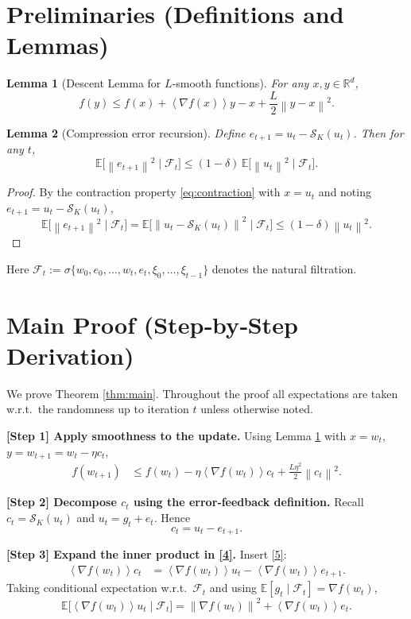 \documentclass{article}
\newtheorem{lemma}{Lemma}
\newcommand{\E}{\mathbb{E}}
\newcommand{\R}{\mathbb{R}}
\newcommand{\norm}[1]{\left\|#1\right\|}
\newcommand{\inner}[1]{\left\langle#1\right\rangle}
\newcommand{\topk}[1]{\mathcal{S}_K\!\left(#1\right)}
\begin{document}
\section*{Preliminaries (Definitions and Lemmas)}
\begin{lemma}[Descent Lemma for $L$‑smooth functions]\label{lem:descent}
For any $x,y\in\R^d$,
\[
f(y)\le f(x)+\inner{\nabla f(x)}{y-x}+\frac{L}{2}\norm{y-x}^2 .
\]
\end{lemma}
\begin{lemma}[Compression error recursion]\label{lem:error}
Define $e_{t+1}=u_t-\topk{u_t}$. Then for any $t$,
\[
\E\!\bigl[\norm{e_{t+1}}^2\mid \mathcal{F}_t\bigr]\le (1-\delta)\,\E\!\bigl[\norm{u_t}^2\mid\mathcal{F}_t\bigr] .
\tag{3}
\]
\end{lemma}
\begin{proof}
By the contraction property \eqref{eq:contraction} with $x=u_t$ and noting $e_{t+1}=u_t-\topk{u_t}$,
\[
\E\!\bigl[\norm{e_{t+1}}^2\mid\mathcal{F}_t\bigr]=
\E\!\bigl[\norm{u_t-\topk{u_t}}^2\mid\mathcal{F}_t\bigr]
\le (1-\delta)\norm{u_t}^2 .
\]
\end{proof}
Here $\mathcal{F}_t:=\sigma\{w_0,e_0,\dots,w_t,e_t,\xi_0,\dots,\xi_{t-1}\}$ denotes the natural filtration.

\section*{Main Proof (Step‑by‑Step Derivation)}
We prove Theorem \ref{thm:main}. Throughout the proof all expectations are taken w.r.t.\ the randomness up to iteration $t$ unless otherwise noted.

\bigskip
\noindent\textbf{[Step 1] Apply smoothness to the update.}  
Using Lemma \ref{lem:descent} with $x=w_t$, $y=w_{t+1}=w_t-\eta c_t$,
\begin{align}
f(w_{t+1}) &\le f(w_t)-\eta\inner{\nabla f(w_t)}{c_t}
               +\frac{L\eta^2}{2}\norm{c_t}^2 .
\tag{4}
\end{align}

\noindent\textbf{[Step 2] Decompose $c_t$ using the error‑feedback definition.}  
Recall $c_t=\topk{u_t}$ and $u_t=g_t+e_t$. Hence
\[
c_t = u_t - e_{t+1} .
\tag{5}
\]

\noindent\textbf{[Step 3] Expand the inner product in \eqref{4}.}  
Insert \eqref{5}:
\begin{align}
\inner{\nabla f(w_t)}{c_t}
&= \inner{\nabla f(w_t)}{u_t} - \inner{\nabla f(w_t)}{e_{t+1}} .
\tag{6}
\end{align}
Taking conditional expectation w.r.t.\ $\mathcal{F}_t$ and using $\E[g_t\mid\mathcal{F}_t]=\nabla f(w_t)$,
\[
\E\!\bigl[\inner{\nabla f(w_t)}{u_t}\mid\mathcal{F}_t\bigr]
= \norm{\nabla f(w_t)}^2 + \inner{\nabla f(w_t)}{e_t}.
\tag{7}
\]
\end{document}
